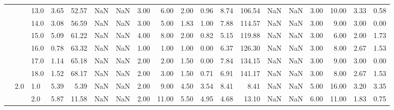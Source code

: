 \begin{tabular}{lllrrrrrrrrrrrrrrrr}
          &     & 13.0 &      3.65 &      52.57 &               NaN &                NaN &  3.00 &   6.00 &             2.00 &                         0.96 &      8.74 &     106.54 &               NaN &                NaN &  3.00 &  10.00 &             3.33 &                         0.58 \\
          &     & 14.0 &      3.08 &      56.59 &               NaN &                NaN &  3.00 &   5.00 &             1.83 &                         1.00 &      7.88 &     114.57 &               NaN &                NaN &  3.00 &   9.00 &             3.00 &                         0.00 \\
          &     & 15.0 &      5.09 &      61.22 &               NaN &                NaN &  4.00 &   8.00 &             2.00 &                         0.82 &      5.15 &     119.88 &               NaN &                NaN &  3.00 &   6.00 &             2.00 &                         1.73 \\
          &     & 16.0 &      0.78 &      63.32 &               NaN &                NaN &  1.00 &   1.00 &             1.00 &                         0.00 &      6.37 &     126.30 &               NaN &                NaN &  3.00 &   8.00 &             2.67 &                         1.53 \\
          &     & 17.0 &      1.14 &      65.18 &               NaN &                NaN &  2.00 &   2.00 &             1.50 &                         0.00 &      7.84 &     134.15 &               NaN &                NaN &  3.00 &   9.00 &             3.00 &                         0.00 \\
          &     & 18.0 &      1.52 &      68.17 &               NaN &                NaN &  2.00 &   3.00 &             1.50 &                         0.71 &      6.91 &     141.17 &               NaN &                NaN &  3.00 &   8.00 &             2.67 &                         1.53 \\
          & 2.0 & 1.0  &      5.39 &       5.39 &               NaN &                NaN &  2.00 &   9.00 &             4.50 &                         3.54 &      8.41 &       8.41 &               NaN &                NaN &  5.00 &  16.00 &             3.20 &                         3.35 \\
          &     & 2.0  &      5.87 &      11.58 &               NaN &                NaN &  2.00 &  11.00 &             5.50 &                         4.95 &      4.68 &      13.10 &               NaN &                NaN &  6.00 &  11.00 &             1.83 &                         0.75 \\

\end{tabular}
